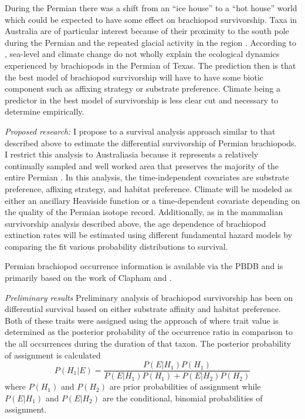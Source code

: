 \documentclass[12pt,letterpaper]{article}
\begin{document}
During the Permian there was a shift from an ``ice house'' to a ``hot house'' world \citep{Fielding2006,Birgenheier2010,Jones2006,Powell2007} which could be expected to have some effect on brachiopod survivorship. Taxa in Australia are of particular interest because of their proximity to the south pole during the Permian and the repeated glacial activity in the region \citep{Fielding2006,Birgenheier2010,Jones2006}. According to \citet{Olszewski2004}, sea-level and climate change do not wholly explain the ecological dynamics experienced by brachiopods in the Permian of Texas. The prediction then is that the best model of brachiopod survivorship will have to have some biotic component such as affixing strategy or substrate preference. Climate being a predictor in the best model of survivorship is less clear cut and necessary to determine empirically.


\textit{Proposed research:}
I propose to a survival analysis approach similar to that described above to estimate the differential survivorship of Permian brachiopods. I restrict this analysis to Australiasia because it represents a relatively continually sampled and well worked area that preserves the majority of the entire Permian \citep{Clapham2012,Clapham2008a,Waterhouse1987,Archbold1995}. In this analysis, the time-independent covariates are substrate preference, affixing strategy, and habitat preference. Climate will be modeled as either an ancillary Heaviside function or a time-dependent covariate depending on the quality of the Permian isotope record. Additionally, as in the mammalian survivorship analysis described above, the age dependence of brachiopod extinction rates will be estimated using different fundamental hazard models by comparing the fit various probability distributions to survival.

Permian brachiopod occurrence information is available via the PBDB and is primarily based on the work of Clapham \citep{Clapham2006,Clapham2008a,Clapham2007a,Clapham2012,Clapham2007} and \citet{Waterhouse1987}.


\textit{Preliminary results}
Preliminary analysis of brachiopod survivorship has been on differential survival based on either substrate affinity and habitat preference. Both of these traits were assigned using the approach of \citet{Simpson2009} where trait value is determined as the posterior probability of the occurrence ratio in comparison to the all occurrences during the duration of that taxon. The posterior probability of assignment is calculated
\begin{equation}
  P(H_{1}|E) = \frac{P(E|H_{1})P(H_{1})}{P(E|H_{1})P(H_{1}) + P(E|H_{2})P(H_{2})}
\end{equation}
where \(P(H_{1})\) and \(P(H_{2})\) are prior probabilities of assignment while \(P(E|H_{1})\) and \(P(E|H_{2})\) are the conditional, binomial probabilities of assignment. 
\end{document}
